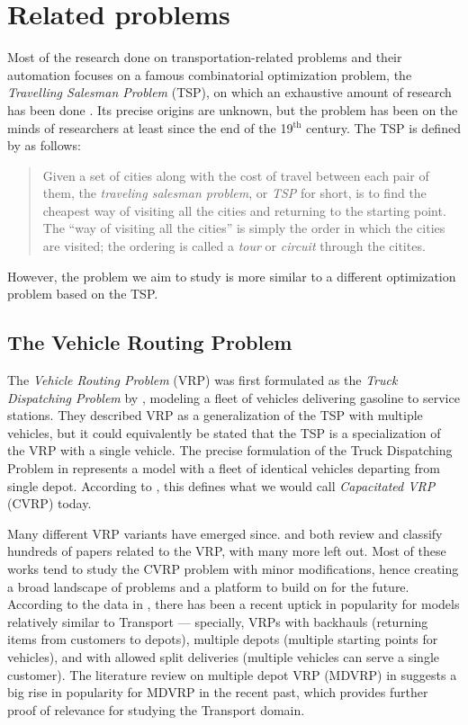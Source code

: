 \section{Related problems}

Most of the research done on transportation-related problems and their automation focuses
on a famous combinatorial optimization problem, the \textit{Travelling Salesman Problem} (TSP), on which an
exhaustive amount of research has been done \citep{Applegate1998, Applegate2011}.
Its precise origins are unknown, but the problem has been on the minds of researchers at least since the end of the 19$^\textrm{th}$ century. The TSP is defined by \citet{Applegate2011} as follows:

\begin{quote}
Given a set of cities along with the cost of travel between each pair of them, the \textit{traveling salesman problem}, or \textit{TSP} for short, is to find the cheapest way of visiting all the cities and returning to the starting point. The ``way of visiting all the cities'' is simply the order in which the cities are visited; the ordering is called a \textit{tour} or \textit{circuit} through the citites.
\end{quote}

However, the problem we aim to study is more similar to a different optimization problem based on the TSP.

\subsection{The Vehicle Routing Problem}

The \textit{Vehicle Routing Problem} (VRP) was first formulated as the \textit{Truck Dispatching Problem} by \citet{Dantzig1959}, modeling a fleet of vehicles delivering gasoline to service stations. They described VRP as a generalization of the TSP with multiple vehicles, but it could equivalently be stated that the TSP is a specialization of the VRP
with a single vehicle. The precise formulation of the Truck Dispatching Problem in \citep[Section~2]{Dantzig1959} represents a model with a fleet of identical vehicles departing from single depot. According to \citet[Section~3]{Braekers2016}, this defines what we would call \textit{Capacitated VRP} (CVRP) today.

Many different VRP variants have emerged since. \citet{Eksioglu2009} and \citet{Braekers2016} both
review and classify hundreds of papers related to the VRP, with many more left out.
Most of these works tend to study the CVRP problem with minor modifications, hence creating
a broad landscape of problems and a platform to build on for the future.
According to the data in \citet[Table~4]{Braekers2016}, there has been a recent uptick
in popularity for models relatively similar to Transport --- specially, VRPs with
backhauls (returning items from customers to depots),
multiple depots (multiple starting points for vehicles), and with allowed split deliveries (multiple
vehicles can serve a single customer).
The literature review on multiple depot VRP (MDVRP) in \citet{Montoya-Torres2015}
suggests a big rise in popularity for MDVRP in the recent past,
which provides further proof of relevance for studying the Transport domain.

